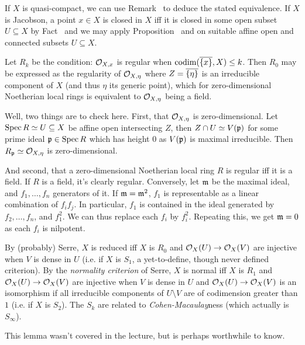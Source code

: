 \documentclass[a4paper,parskip=half,numbers=enddot, DIV=12]{scrreprt}
\begin{document}
\begin{rem*}
\begin{alphanumerate}
         If $X$ is quasi-compact, we can use Remark~ to deduce the stated equivalence. If $X$ is Jacobson, a point $x\in X$ is closed in $X$ iff it is closed in some open subset $U\subseteq X$ by Fact~ and we may apply Proposition~ and  on suitable affine open and connected subsets $U\subseteq X$.
    \item 
        Let $R_k$ be the condition: $\mathcal{O}_{X,x}$ is regular when $\operatorname{codim}(\overline{\{x\}}, X) \leq k$. Then $R_0$ may be expressed as the regularity of $\mathcal{O}_{X,\eta}$ where $Z=\overline{\left\{\eta\right\}}$ is an irreducible component of $X$ (and thus $\eta$ its generic point), which for zero-dimensional Noetherian local rings is equivalent to $\mathcal{O}_{X,\eta}$ being a field. 
        
        Well, two things are to check here. First, that $\mathcal{O}_{X,\eta}$ is zero-dimensional. Let $\operatorname{Spec} R\simeq U\subseteq X$ be affine open intersecting $Z$, then $Z\cap U\simeq V(\mathfrak{p})$ for some prime ideal $\mathfrak{p}\in\operatorname{Spec} R$ which has height $0$ as $V(\mathfrak{p})$ is maximal irreducible. Then $R_{\mathfrak{p}}\simeq \mathcal{O}_{X,\eta}$ is zero-dimensional.  
        
        And second, that a zero-dimensional Noetherian local ring $R$ is regular iff it is a field. If $R$ is a field, it's clearly regular. Conversely, let $\mathfrak{m}$ be the maximal ideal, and $f_1,\ldots,f_n$ generators of it. If $\mathfrak{m}=\mathfrak{m}^2$, $f_1$ is representable as a linear combination of $f_if_j$. In particular, $f_1$ is contained in the ideal generated by $f_2,\ldots,f_n$, and $f_1^2$. We can thus replace each $f_i$ by $f_i^2$. Repeating this, we get $\mathfrak{m}=0$ as each $f_i$ is nilpotent.
        
          By (probably) Serre, $X$ is reduced iff $X$ is $R_0$ and $\Oo_X(U)\morphism \Oo_X(V)$ are injective when $V$ is dense in $U$ (i.e. if $X$ is $S_1$, a yet-to-define, though never defined criterion). By the \emph{normality criterion} of Serre, $X$ is normal iff $X$ is $R_1$ and $\Oo_X(U)\morphism \Oo_X(V)$ are injective when $V$ is dense in $U$ and $\Oo_X(U)\morphism \Oo_X(V)$ is an isomorphism if all irreducible components of $U\setminus V$ are of codimension greater than $1$ (i.e. if $X$ is $S_2$). The $S_k$ are related  to \emph{Cohen-Macaulay}ness (which actually is $S_\infty$).
    \end{alphanumerate}
\end{rem*}
This lemma wasn't covered in the lecture, but is perhaps worthwhile to know.
\end{document}
